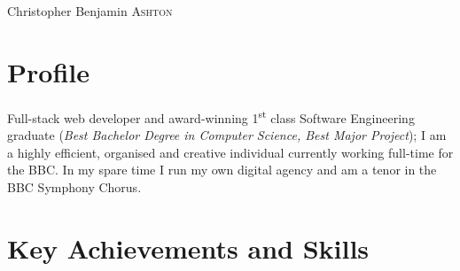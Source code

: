 \documentclass[class=article, crop=false]{standalone}
\begin{document}
\par{\centering
        {\Huge Christopher Benjamin \textsc{Ashton}
    }\bigskip\par}

\begin{center}
\customcontact
\end{center}


\section{Profile}

Full-stack web developer and award-winning 1\textsuperscript{st} class Software Engineering graduate (\emph{Best Bachelor Degree in Computer Science, Best Major Project}); I am a highly efficient, organised and creative individual currently working full-time for the BBC. In my spare time I run my own digital agency and am a tenor in the BBC Symphony Chorus.

\section{Key Achievements and Skills}
\end{document}
